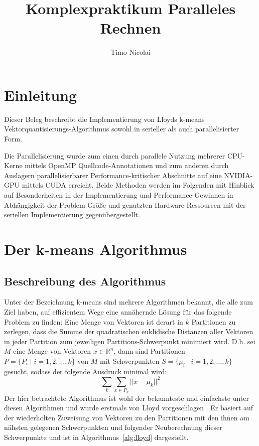 \documentclass[ngerman, cd=lightcolor, cdmath=false]{tudscrreprt}
\begin{document}
\title{Komplexpraktikum Paralleles Rechnen}

\author{
  Timo Nicolai
}


\headingsvskip=-100pt

\maketitle
\tableofcontents
\pagebreak

\chapter{Einleitung}
Dieser Beleg beschreibt die Implementierung von Lloyds k-means
Vektorquantisierungs-Algorithmus sowohl in serieller als auch parallelisierter
Form.

Die Parallelisierung wurde zum einen durch parallele Nutzung mehrerer CPU-Kerne
mittels OpenMP Quellcode-Annotationen und zum anderen durch Auslagern
parallelisierbarer Performance-kritischer Abschnitte auf eine NVIDIA-GPU
mittels CUDA erreicht. Beide Methoden werden im Folgenden mit Hinblick auf
Besonderheiten in der Implementierung und Performance-Gewinnen in Abhängigkeit
der Problem-Größe und genutzten Hardware-Ressourcen mit der seriellen
Implementierung gegenübergestellt.

\chapter{Der k-means Algorithmus}

\section{Beschreibung des Algorithmus}

Unter der Bezeichnung k-means sind mehrere Algorithmen bekannt, die alle zum
Ziel haben, auf effizientem Wege eine annähernde Lösung für das folgende Problem
zu finden:
\bigbreak
Eine Menge von Vektoren ist derart in $k$ Partitionen zu zerlegen, dass die
Summe der quadratischen euklidische Distanzen aller Vektoren in jeder Partition
zum jeweiligen Partitions-Schwerpunkt minimiert wird. D.h. sei $M$ eine Menge
von Vektoren $x \in \mathbb{R}^n$, dann sind Partitionen $P = \{P_i \mid i =
1,2,\dots,k\}$ von $M$ mit Schwerpunkten $S = \{\mu_i \mid i = 1, 2, \dots,
k\}$ gesucht, sodass der folgende Ausdruck minimal wird:
$$
\sum_{k} \sum_{x \in P_k} ||x - \mu_k||^2
$$
Der hier betrachtete Algorithmus ist wohl der bekannteste und einfachste unter
diesen Algorithmen und wurde erstmals von Lloyd vorgeschlagen \cite{bib:lloyd}.
Er basiert auf der wiederholten Zuweisung von Vektoren zu den Partitionen mit
den ihnen am nähsten gelegenen Schwerpunkten und folgender Neuberechnung dieser
Schwerpunkte und ist in Algorithmus~\ref{alg:lloyd} dargestellt.
\end{document}
